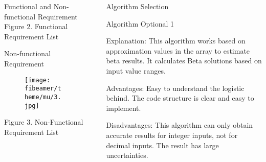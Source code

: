 \documentclass[final]{beamer}
\newlength{\sepwid}
\newlength{\onecolwid}
\newlength{\twocolwid}
\begin{document}
\begin{frame}
\begin{columns}[t]
\begin{column}{\onecolwid}
\begin{exampleblock}{Functional and Non-functional Requirement}
            Figure 2. Functional Requirement List   
             \item Non-functional Requirement
              
   \begin{figure}
\texttt{[image: fibeamer/theme/mu/3.jpg]}
\end{figure}
 Figure 3. Non-Functional Requirement List 

\end{exampleblock}



\end{column} %

\begin{column}{\sepwid}\end{column} %

\begin{column}{\twocolwid} %

\begin{columns}[t,totalwidth=\twocolwid] %

\begin{column}{\onecolwid}\vspace{-.74in} %





\begin{exampleblock}{ Algorithm Selection}

             
              \item Algorithm Optional 1
               \begin{itemize}
             {\small      \item Explanation: This algorithm works based on approximation values in the array to estimate beta results. It calculates Beta solutions based on input value ranges.
                \item Advantages: Easy to understand the logistic behind. The code structure is clear and easy to implement. \\
\item Disadvantages: This algorithm can only obtain accurate results for integer inputs, not for decimal inputs. The result has large uncertainties. 

}
\end{itemize}
\end{exampleblock}
\end{column}
\end{columns}
\end{column}
\end{columns}
\end{frame}
\end{document}
